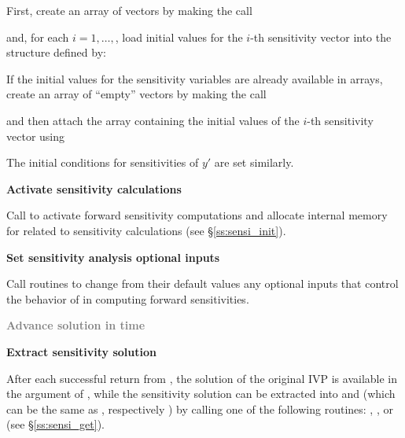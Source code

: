 \begin{Steps}
  First, create an array of  vectors by making the call

  {\s} 

  {\p} 

  and, for each $i=1,\ldots,$, load initial values for the $i$-th sensitivity 
  vector into the structure defined by:

  {\s} 

  {\p} 

  If the initial values for the sensitivity variables are already available in
   arrays, create an array of  ``empty'' vectors by making the call

  {\s} 

  {\p} 

  and then attach the  array  containing the initial values of the
  $i$-th sensitivity vector using

  {\s} 
  
  {\p} 

  The initial conditions for sensitivities  of $y'$ are set similarly.  

\item
  {\bf Activate sensitivity calculations}

  Call \id{(\ldots);} to activate forward 
  sensitivity computations and allocate internal memory for {\idas} related 
  to sensitivity calculations (see \S\ref{ss:sensi_init}).

\item
  {\bf Set sensitivity analysis optional inputs}

  Call  routines to change from their default values any
  optional inputs that control the behavior of {\idas} in computing forward 
  sensitivities.

\item
  \textcolor{gray}{\bf Advance solution in time}

\item
  {\bf Extract sensitivity solution}

  After each successful return from , the solution of the
  original IVP is available in the  argument of ,
  while the sensitivity solution can be extracted into  and 
  (which can be the same as , respectively ) by calling 
  one of the following routines: , , 
   or  (see \S\ref{ss:sensi_get}).


\end{Steps}
